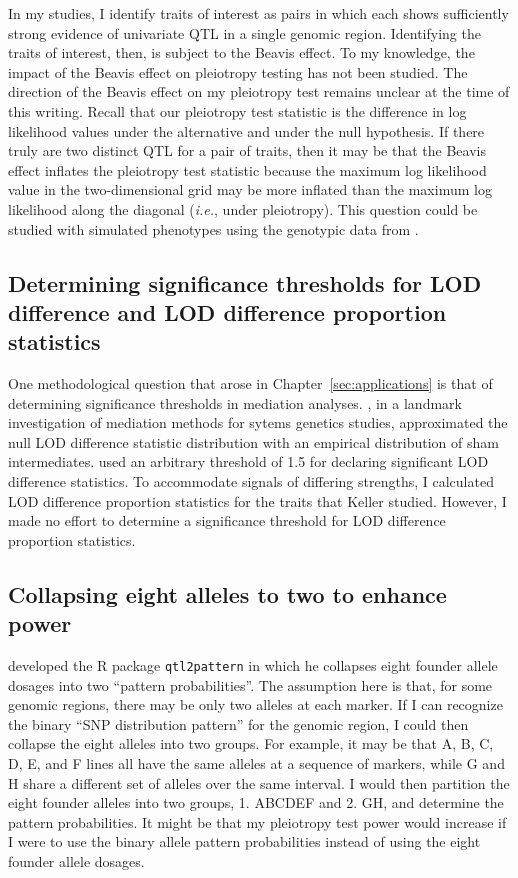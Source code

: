 In my studies, I identify traits of interest as pairs in which each shows sufficiently strong evidence of univariate QTL in a single genomic region. Identifying the traits of interest, then, is subject to the Beavis effect. To my knowledge, the impact of the Beavis effect on pleiotropy testing has not been studied. The direction of the Beavis effect on my pleiotropy test remains unclear at the time of this writing. Recall that our pleiotropy test statistic is the difference in log likelihood values under the alternative and under the null hypothesis. If there truly are two distinct QTL for a pair of traits, then it may be that the Beavis effect inflates the pleiotropy test statistic because the maximum log likelihood value in the two-dimensional grid may be more inflated than the maximum log likelihood along the diagonal (\emph{i.e.}, under pleiotropy). This question could be studied with simulated phenotypes using the genotypic data from \citet{keller2018genetic}.






\subsection{Determining significance thresholds for LOD difference and LOD difference proportion statistics}

One methodological question that arose in Chapter~\ref{sec:applications} is that of determining significance thresholds in mediation analyses. \citet{chick2016defining}, in a landmark investigation of mediation methods for sytems genetics studies, approximated the null LOD difference statistic distribution with an empirical distribution of sham intermediates. \citet{keller2018genetic} used an arbitrary threshold of 1.5 for declaring significant LOD difference statistics. To accommodate signals of differing strengths, I calculated LOD difference proportion statistics for the traits that Keller studied. However, I made no effort to determine a significance threshold for LOD difference proportion statistics. 

\subsection{Collapsing eight alleles to two to enhance power}

\citet{qtl2pattern} developed the R package \texttt{qtl2pattern} in which he collapses eight founder allele dosages into two ``pattern probabilities''. The assumption here is that, for some genomic regions, there may be only two alleles at each marker. If I can recognize the binary ``SNP distribution pattern'' for the genomic region, I could then collapse the eight alleles into two groups. For example, it may be that A, B, C, D, E, and F lines all have the same alleles at a sequence of markers, while G and H share a different set of alleles over the same interval. I would then partition the eight founder alleles into two groups, 1. ABCDEF and 2. GH, and determine the pattern probabilities. It might be that my pleiotropy test power would increase if I were to use the binary allele pattern probabilities instead of using the eight founder allele dosages. 

